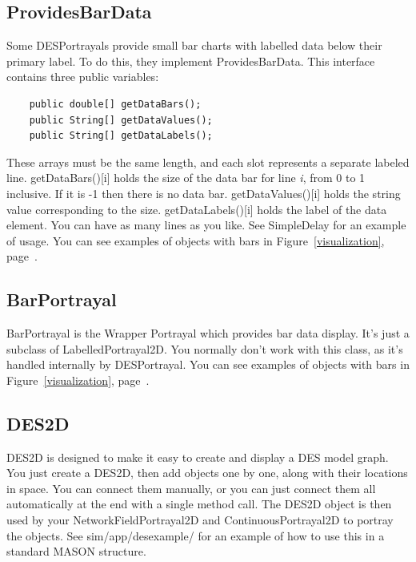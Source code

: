 \documentclass[twoside,10pt]{article}
\newcommand\file[1]{\textsf{#1}}
\newcommand\variable[1]{\textsf{#1}}
\begin{document}
\subsection{ProvidesBarData}

Some DESPortrayals provide small bar charts with labelled data below their primary label.  To do this, they implement ProvidesBarData.  This interface contains three public variables:

\begin{verbatim}
    public double[] getDataBars();
    public String[] getDataValues();
    public String[] getDataLabels();
\end{verbatim}

These arrays must be the same length, and each slot represents a separate labeled line.  \variable{getDataBars()[i]} holds the size of the data bar for line {\it i}, from 0 to 1 inclusive.  If it is -1 then there is no data bar.  \variable{getDataValues()[i]} holds the string value corresponding to the size.  \variable{getDataLabels()[i]} holds the label of the data element.  You can have as many lines as you like.  See SimpleDelay for an example of usage.  You can see examples of objects with bars in Figure~\ref{visualization}, page~\pageref{visualization}.

\subsection{BarPortrayal}

BarPortrayal is the Wrapper Portrayal which provides bar data display.  It's just a subclass of LabelledPortrayal2D.  You normally don't work with this class, as it's handled internally by DESPortrayal.   You can see examples of objects with bars in Figure~\ref{visualization}, page~\pageref{visualization}.

\subsection{DES2D}

DES2D is designed to make it easy to create and display a DES model graph.  You just create a DES2D, then add objects one by one, along with their locations in space.  You can connect them manually, or you can just connect them all automatically at the end with a single method call.  The DES2D object is then used by your NetworkFieldPortrayal2D and ContinuousPortrayal2D to portray the objects.  See \file{sim/app/desexample/} for an example of how to use this in a standard MASON structure.
\end{document}
